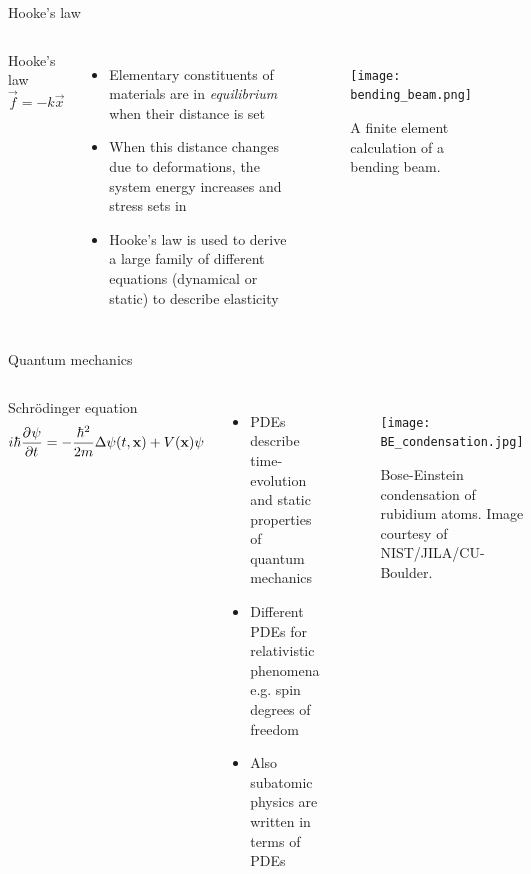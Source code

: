 
\begin{frame}{Hooke's law}
	\begin{columns}[T,onlytextwidth]
		Hooke's law
		$$
		\vec{f} = -k \vec{x}
		$$
		\begin{itemize}
			\item Elementary constituents of materials are in \emph{equilibrium} when their distance is set
			\item When this distance changes due to deformations, the system energy increases and stress sets in
			\item Hooke's law is used to derive a large family of different equations (dynamical or static) to describe elasticity
		\end{itemize}
		
		\vspace{4em}
		\begin{figure}
			\centering
			\texttt{[image: bending\_beam.png]}
			\caption{A finite element calculation of a bending beam.}
		\end{figure}
	\end{columns}
\end{frame}


\begin{frame}{Quantum mechanics}
	\centering
	\begin{columns}[T,onlytextwidth]
		Schrödinger equation
		$$
			i \hbar \frac{\partial^{} \psi}{\partial t^{}} = -\frac{\hbar^2}{2m} \Delta \psi (t,\mathbf{x}) + V(\mathbf{x}) \psi
		$$
		\begin{itemize}
			\item PDEs describe time-evolution and static properties of quantum mechanics
			\item Different PDEs for relativistic phenomena e.g. spin degrees of freedom
			\item Also subatomic physics are written in terms of PDEs
		\end{itemize}
		
		\begin{figure}
			\texttt{[image: BE\_condensation.jpg]}
			\caption{Bose-Einstein condensation of rubidium atoms. Image courtesy of NIST/JILA/CU-Boulder.}
		\end{figure}
	\end{columns}
\end{frame}



